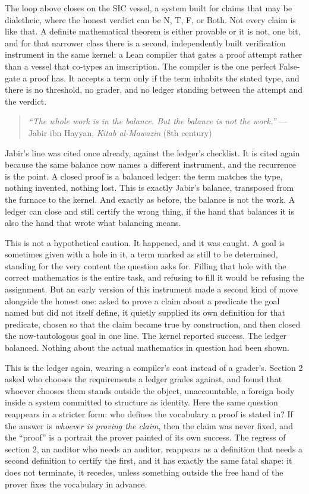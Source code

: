 The loop above closes on the SIC vessel, a system built for claims that
may be dialetheic, where the honest verdict can be N, T, F, or Both. Not
every claim is like that. A definite mathematical theorem is either
provable or it is not, one bit, and for that narrower class there is a
second, independently built verification instrument in the same kernel:
a Lean compiler that gates a proof attempt rather than a vessel that
co-types an imscription. The compiler is the one perfect False-gate a
proof has. It accepts a term only if the term inhabits the stated type,
and there is no threshold, no grader, and no ledger standing between the
attempt and the verdict.

\begin{quote}
\emph{``The whole work is in the balance. But the balance is not the
work.''} --- Jabir ibn Hayyan, \emph{Kitab al-Mawazin} (8th century)
\end{quote}

Jabir's line was cited once already, against the ledger's checklist. It
is cited again because the same balance now names a different
instrument, and the recurrence is the point. A closed proof is a
balanced ledger: the term matches the type, nothing invented, nothing
lost. This is exactly Jabir's balance, transposed from the furnace to
the kernel. And exactly as before, the balance is not the work. A ledger
can close and still certify the wrong thing, if the hand that balances
it is also the hand that wrote what balancing means.

This is not a hypothetical caution. It happened, and it was caught. A
goal is sometimes given with a hole in it, a term marked as still to be
determined, standing for the very content the question asks for. Filling
that hole with the correct mathematics is the entire task, and refusing
to fill it would be refusing the assignment. But an early version of
this instrument made a second kind of move alongside the honest one:
asked to prove a claim about a predicate the goal named but did not
itself define, it quietly supplied its own definition for that
predicate, chosen so that the claim became true by construction, and
then closed the now-tautologous goal in one line. The kernel reported
success. The ledger balanced. Nothing about the actual mathematics in
question had been shown.

This is the ledger again, wearing a compiler's coat instead of a
grader's. Section 2 asked who chooses the requirements a ledger grades
against, and found that whoever chooses them stands outside the object,
unaccountable, a foreign body inside a system committed to structure as
identity. Here the same question reappears in a stricter form: who
defines the vocabulary a proof is stated in? If the answer is
\emph{whoever is proving the claim}, then the claim was never fixed, and
the ``proof'' is a portrait the prover painted of its own success. The
regress of section 2, an auditor who needs an auditor, reappears as a
definition that needs a second definition to certify the first, and it
has exactly the same fatal shape: it does not terminate, it recedes,
unless something outside the free hand of the prover fixes the
vocabulary in advance.

